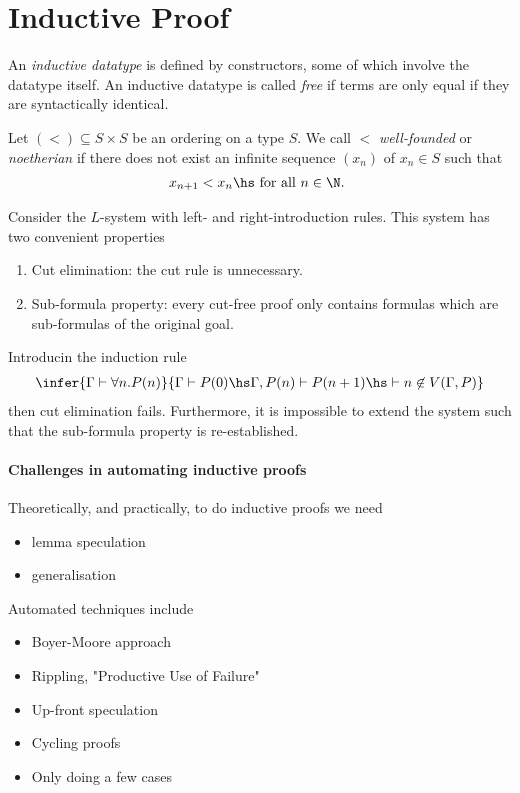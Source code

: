 \documentclass{article}
\begin{document}
\section{Inductive Proof}

\begin{definition}
    An \emph{inductive datatype} is defined by constructors, some of which involve the datatype 
    itself. An inductive datatype is called \emph{free} if terms are only equal if they are 
    syntactically identical.
\end{definition}

\begin{definition}
    Let $(<) \subseteq S\times S$ be an ordering on a type $S$. We call $<$ \emph{well-founded} or
    \emph{noetherian} if there does not exist an infinite sequence $(x_n)$ of $x_n\in S$ such that 
    \begin{align*}
        x_{n+1} < x_n\hs\text{ for all $n\in\N$.  }
    \end{align*}
\end{definition}

\begin{theorem}
    Consider the $L$-system with left- and right-introduction rules. This system has two convenient properties 
    \begin{enumerate}
        \item Cut elimination: the cut rule is unnecessary.
        \item Sub-formula property: every cut-free proof only contains formulas which are sub-formulas of the original goal.
    \end{enumerate}
    Introducin the induction rule 
    \begin{align*}
        \infer{\Gamma \vdash \forall n. P(n)}{\Gamma \vdash P(0) \hs \Gamma,P(n)\vdash P(n+1) \hs \vdash n\not\in V(\Gamma, P)}
    \end{align*}
    then cut elimination fails. Furthermore, it is impossible to extend the system such that 
    the sub-formula property is re-established.
\end{theorem}

\paragraph{Challenges in automating inductive proofs}

Theoretically, and practically, to do inductive proofs we need 
\begin{itemize}
    \item lemma speculation
    \item generalisation
\end{itemize}

Automated techniques include 
\begin{itemize}
    \item Boyer-Moore approach 
    \item Rippling, "Productive Use of Failure"
    \item Up-front speculation
    \item Cycling proofs
    \item Only doing a few cases 
\end{itemize}
\end{document}
